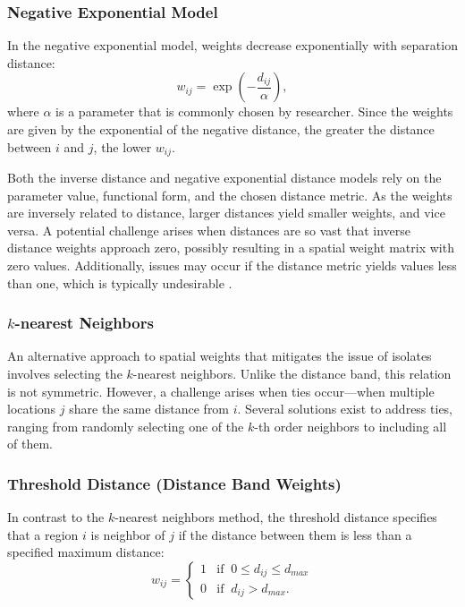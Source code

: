 \documentclass[english,12pt]{book}\usepackage[]{graphicx}\usepackage[]{xcolor}
\begin{document}
\subsubsection{Negative Exponential Model}

In the negative exponential model, weights decrease exponentially with separation distance:
\begin{equation*}
  w_{ij} = \exp\left(-\frac{d_{ij}}{\alpha}\right),
\end{equation*}
%
where $\alpha$ is a parameter that is commonly chosen by researcher. Since the weights are given by the exponential of the negative distance, the greater the distance between $i$ and $j$, the lower $w_{ij}$.

Both the inverse distance and negative exponential distance models rely on the parameter value, functional form, and the chosen distance metric. As the weights are inversely related to distance, larger distances yield smaller weights, and vice versa. A potential challenge arises when distances are so vast that inverse distance weights approach zero, possibly resulting in a spatial weight matrix with zero values. Additionally, issues may occur if the distance metric yields values less than one, which is typically undesirable \citep{anselin2014modern}. 

\subsubsection{$k$-nearest Neighbors}

An alternative approach to spatial weights that mitigates the issue of isolates involves selecting the $k$-nearest neighbors. Unlike the distance band, this relation is not symmetric. However, a challenge arises when ties occur—when multiple locations $j$ share the same distance from $i$. Several solutions exist to address ties, ranging from randomly selecting one of the $k$-th order neighbors to including all of them.

\subsubsection{Threshold Distance (Distance Band Weights)}

In contrast to the $k$-nearest neighbors method, the threshold distance specifies that a region $i$ is neighbor of $j$ if the distance between them is less than a specified maximum distance:
\begin{equation*}
  w_{ij}= 
   \begin{cases}
      1 & \mbox{if}\;\; 0\leq d_{ij} \leq d_{max} \\ 
      0 & \mbox{if}\;\; d_{ij} > d_{max}.
   \end{cases}
\end{equation*}
\end{document}
